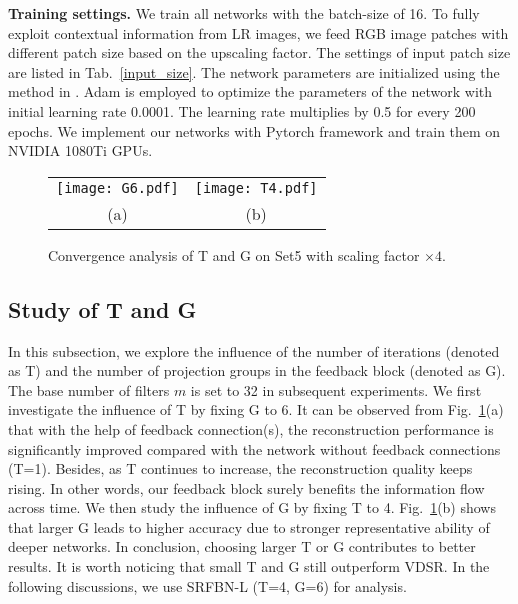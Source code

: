 \documentclass[10pt,twocolumn,letterpaper]{article}
\begin{document}
	\textbf{Training settings.} We train all networks with the batch-size of 16. To fully exploit contextual information from LR images, we feed RGB image patches with different patch size based on the upscaling factor. The settings of input patch size are listed in Tab.~\ref{input_size}. The network parameters are initialized using the method in \cite{DBLP:conf/iccv/HeZRS15}. Adam\cite{Kingma2014Adam} is employed to optimize the parameters of the network with initial learning rate 0.0001. The learning rate multiplies by 0.5 for every 200 epochs. We implement our networks with Pytorch framework and train them on NVIDIA 1080Ti GPUs.
	
	\begin{figure}[!htbp]
		\begin{center}
			\begin{tabular}{@{}c@{}c@{}}
				\texttt{[image: G6.pdf]} & \texttt{[image: T4.pdf]}\\
				
				\small (a)& \small (b)
			\end{tabular}
			
		\end{center}
		\caption{Convergence analysis of T and G on Set5 with scaling factor $\times 4$.}
		\label{T_and_G}	
		\vspace{-0.45cm}
	\end{figure}
	

	\subsection{Study of T and G}   
	 In this subsection, we explore the influence of the number of iterations (denoted as T) and the number of projection groups in the feedback block (denoted as G). The base number of filters $m$ is set to 32 in subsequent experiments. We first investigate the influence of T by fixing G to 6. It can be observed from Fig.~\ref{T_and_G}(a) that with the help of feedback connection(s), the reconstruction performance is significantly improved compared with the network without feedback connections (T=1). Besides, as T continues to increase, the reconstruction quality keeps rising. In other words, our feedback block surely benefits the information flow across time. We then study the influence of G by fixing T to 4. Fig.~\ref{T_and_G}(b) shows that larger G leads to higher accuracy due to stronger representative ability of deeper networks. In conclusion, choosing larger T or G contributes to better results. It is worth noticing that small T and G still outperform VDSR\cite{Kim_2016_CVPR}. In the following discussions, we use SRFBN-L (T=4, G=6) for analysis. 
	
\end{document}
